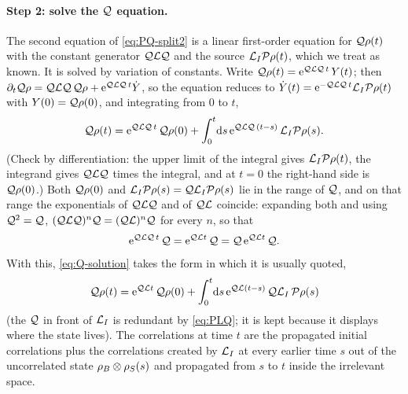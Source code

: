\paragraph{Step 2: solve the $\mathcal{Q}$ equation.}
The second equation of \eqref{eq:PQ-split2} is a linear first-order equation for $\mathcal{Q}\rho(t)$ with the constant generator $\mathcal{Q}\mathcal{L}\mathcal{Q}$ and the source $\mathcal{L}_I\mathcal{P}\rho(t)$, which we treat as known.
It is solved by variation of constants.
Write $\mathcal{Q}\rho(t)=\mathrm{e}^{\mathcal{Q}\mathcal{L}\mathcal{Q}\,t}\,Y(t)$; then $\partial_t\mathcal{Q}\rho=\mathcal{Q}\mathcal{L}\mathcal{Q}\,\mathcal{Q}\rho+\mathrm{e}^{\mathcal{Q}\mathcal{L}\mathcal{Q}\,t}\dot Y$, so the equation reduces to $\dot Y(t)=\mathrm{e}^{-\mathcal{Q}\mathcal{L}\mathcal{Q}\,t}\mathcal{L}_I\mathcal{P}\rho(t)$ with $Y(0)=\mathcal{Q}\rho(0)$, and integrating from $0$ to $t$,
\begin{equation}
  \mathcal{Q}\rho(t)=\mathrm{e}^{\mathcal{Q}\mathcal{L}\mathcal{Q}\,t}\,\mathcal{Q}\rho(0)+\int_0^t\!\mathrm{d} s\,\mathrm{e}^{\mathcal{Q}\mathcal{L}\mathcal{Q}\,(t-s)}\,\mathcal{L}_I\mathcal{P}\rho(s).
  \label{eq:Q-solution}
\end{equation}
(Check by differentiation: the upper limit of the integral gives $\mathcal{L}_I\mathcal{P}\rho(t)$, the integrand gives $\mathcal{Q}\mathcal{L}\mathcal{Q}$ times the integral, and at $t=0$ the right-hand side is $\mathcal{Q}\rho(0)$.)
Both $\mathcal{Q}\rho(0)$ and $\mathcal{L}_I\mathcal{P}\rho(s)=\mathcal{Q}\mathcal{L}_I\mathcal{P}\rho(s)$ lie in the range of $\mathcal{Q}$, and on that range the exponentials of $\mathcal{Q}\mathcal{L}\mathcal{Q}$ and of $\mathcal{Q}\mathcal{L}$ coincide: expanding both and using $\mathcal{Q}^2=\mathcal{Q}$, $(\mathcal{Q}\mathcal{L}\mathcal{Q})^n\mathcal{Q}=(\mathcal{Q}\mathcal{L})^n\mathcal{Q}$ for every $n$, so that
\begin{equation}
  \mathrm{e}^{\mathcal{Q}\mathcal{L}\mathcal{Q}\,t}\,\mathcal{Q}=\mathrm{e}^{\mathcal{Q}\mathcal{L} t}\,\mathcal{Q}=\mathcal{Q}\,\mathrm{e}^{\mathcal{Q}\mathcal{L} t}\,\mathcal{Q} .
  \label{eq:expQLQ}
\end{equation}
With this, \cref{eq:Q-solution} takes the form in which it is usually quoted,
\begin{equation}
  \mathcal{Q}\rho(t)=\mathrm{e}^{\mathcal{Q}\mathcal{L} t}\,\mathcal{Q}\rho(0)+\int_0^t\!\mathrm{d} s\,\mathrm{e}^{\mathcal{Q}\mathcal{L}(t-s)}\,\mathcal{Q}\mathcal{L}_I\,\mathcal{P}\rho(s)
  \label{eq:Q-solution2}
\end{equation}
(the $\mathcal{Q}$ in front of $\mathcal{L}_I$ is redundant by \cref{eq:PLQ}; it is kept because it displays where the state lives).
The correlations at time $t$ are the propagated initial correlations plus the correlations created by $\mathcal{L}_I$ at every earlier time $s$ out of the uncorrelated state $\rho_{B}\otimes\rho_{S}(s)$ and propagated from $s$ to $t$ inside the irrelevant space.

